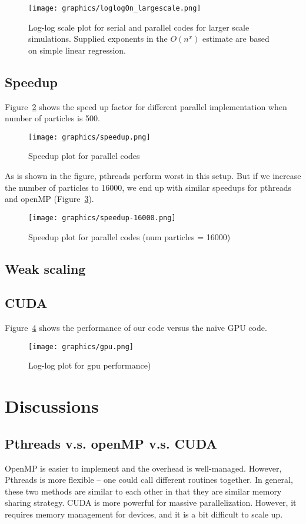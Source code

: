\documentclass[11pt]{article}
\begin{document}
\begin{figure}[htb]
  \centering
  \texttt{[image: graphics/loglogOn\_largescale.png]}
  \caption{Log-log scale plot for serial and parallel codes for larger scale simulations. Supplied exponents in the $O(n^x)$ estimate are based on simple linear regression.}
  \label{fig:loglogOn_largescale}
\end{figure}

\subsection{Speedup}
Figure~\ref{fig:speedup} shows the speed up factor for different parallel implementation when number of particles is 500.
\begin{figure}[htb]
  \centering
  \texttt{[image: graphics/speedup.png]}
  \caption{Speedup plot for parallel codes}
  \label{fig:speedup}
\end{figure}

As is shown in the figure, pthreads perform worst in this setup. But if we increase the number of particles to 16000,
we end up with similar speedups for pthreads and openMP (Figure~\ref{fig:speedup-16000}).
\begin{figure}[htb]
  \centering
  \texttt{[image: graphics/speedup-16000.png]}
  \caption{Speedup plot for parallel codes (num particles = 16000)}
  \label{fig:speedup-16000}
\end{figure}

\subsection{Weak scaling}

\subsection{CUDA}
Figure~\ref{fig:gpu} shows the performance of our code versus the naive GPU code.
\begin{figure}[htb]
  \centering
  \texttt{[image: graphics/gpu.png]}
  \caption{Log-log plot for gpu performance)}
  \label{fig:gpu}
\end{figure}

\section{Discussions}
\subsection{Pthreads v.s. openMP v.s. CUDA}
OpenMP is easier to implement and the overhead is well-managed. However, Pthreads is more flexible -- one could call different routines together. In general, these two methods are similar to each other in that they are similar memory
sharing strategy. CUDA is more powerful for massive parallelization. However, it requires memory management for devices, and it is a bit difficult to scale up.
\end{document}
